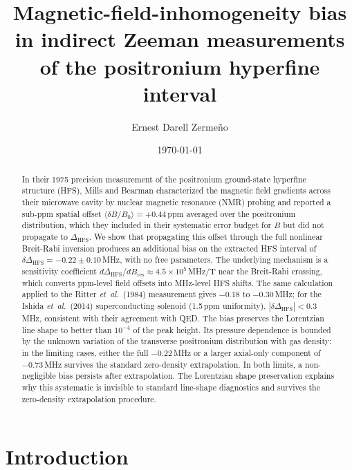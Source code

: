 \documentclass[twocolumn,pra,aps,superscriptaddress,floatfix,10pt]{revtex4-2}
\newcommand{\etal}{\textit{et~al.}}
\begin{document}
\title{Magnetic-field-inhomogeneity bias in indirect Zeeman measurements of the positronium hyperfine interval}

\author{Ernest Darell Zerme\~no}

\date{\today}

\begin{abstract}
In their 1975 precision measurement of the positronium ground-state hyperfine structure (HFS), Mills and Bearman characterized the magnetic field gradients across their microwave cavity by nuclear magnetic resonance (NMR) probing and reported a sub-ppm spatial offset $\langle\delta B/B_0\rangle = +0.44$\,ppm averaged over the positronium distribution, which they included in their systematic error budget for $B$ but did not propagate to $\Delta_\mathrm{HFS}$. We show that propagating this offset through the full nonlinear Breit-Rabi inversion produces an additional bias on the extracted HFS interval of $\delta\Delta_\mathrm{HFS} = -0.22 \pm 0.10$\,MHz, with no free parameters. The underlying mechanism is a sensitivity coefficient $d\Delta_\mathrm{HFS}/dB_\mathrm{res} \approx 4.5 \times 10^5$\,MHz/T near the Breit-Rabi crossing, which converts ppm-level field offsets into MHz-level HFS shifts. The same calculation applied to the Ritter \etal\ (1984) measurement gives $-0.18$ to $-0.30$\,MHz; for the Ishida \etal\ (2014) superconducting solenoid (1.5\,ppm uniformity), $|\delta\Delta_\mathrm{HFS}| < 0.3$\,MHz, consistent with their agreement with QED. The bias preserves the Lorentzian line shape to better than $10^{-4}$ of the peak height. Its pressure dependence is bounded by the unknown variation of the transverse positronium distribution with gas density: in the limiting cases, either the full $-0.22$\,MHz or a larger axial-only component of $-0.73$\,MHz survives the standard zero-density extrapolation. In both limits, a non-negligible bias persists after extrapolation. The Lorentzian shape preservation explains why this systematic is invisible to standard line-shape diagnostics and survives the zero-density extrapolation procedure.
\end{abstract}

\maketitle

\section{Introduction}
\label{sec:intro}
\end{document}
